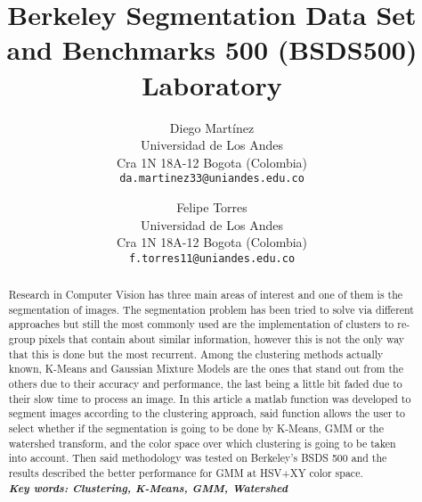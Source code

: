 \documentclass[10pt,twocolumn,letterpaper]{article}
\begin{document}
\title{Berkeley Segmentation Data Set and Benchmarks 500 (BSDS500) Laboratory}

\author{Diego Mart\'inez\\
Universidad de Los Andes\\
Cra 1N 18A-12 Bogot\´a (Colombia)\\
{\tt\small da.martinez33@uniandes.edu.co}
\and
Felipe Torres\\
Universidad de Los Andes\\
Cra 1N 18A-12 Bogot\´a (Colombia)\\
{\tt\small f.torres11@uniandes.edu.co}
}

\maketitle

\begin{abstract}
Research in Computer Vision has three main areas of interest and one of them is the segmentation of images. The segmentation problem has been tried to solve via different approaches but still the most commonly used are the implementation of clusters to re-group pixels that contain about similar information, however this is not the only way that this is done but the most recurrent. Among the clustering methods actually known, K-Means and Gaussian Mixture Models are the ones that stand out from the others due to their accuracy and performance, the last being a little bit faded due to their slow time to process an image. In this article a matlab function was developed to segment images according to the clustering approach, said function allows the user to select whether if the segmentation is going to be done by K-Means, GMM or the watershed transform, and the color space over which clustering is going to be taken into account. Then said methodology was tested on Berkeley's BSDS 500 and the results described the better performance for GMM at HSV+XY color space. \\

\textit{\textbf{Key words: Clustering, K-Means, GMM, Watershed}}
\end{abstract}

\end{document}
